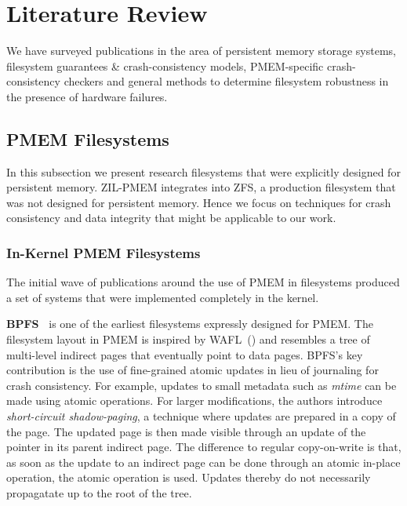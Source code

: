 \documentclass[12pt,a4paper,twoside]{book}
\begin{document}
\section{Literature Review}
We have surveyed publications in the area of persistent memory storage systems, filesystem guarantees \& crash-consistency models, PMEM-specific crash-consistency checkers and general methods to determine filesystem robustness in the presence of hardware failures.

\subsection{PMEM Filesystems}
In this subsection we present research filesystems that were explicitly designed for persistent memory.
ZIL-PMEM integrates into ZFS, a production filesystem that was not designed for persistent memory.
Hence we focus on techniques for crash consistency and data integrity that might be applicable to our work.

\subsubsection{In-Kernel PMEM Filesystems}\label{sec:in_kernel_pmem_filesystems}
The initial wave of publications around the use of PMEM in filesystems produced a set of systems that were implemented completely in the kernel.

\newcommand{\citerelwork}[2]{\textbf{#1~\cite{#2}}}

\citerelwork{BPFS}{conditBetterByteaddressablePersistent2009} is one of the earliest filesystems expressly designed for PMEM.
The filesystem layout in PMEM is inspired by WAFL~(\cite{hitzFileSystemDesign1994}) and resembles a tree of multi-level indirect pages that eventually point to data pages.
BPFS’s key contribution is the use of fine-grained atomic updates in lieu of journaling for crash consistency.
For example, updates to small metadata such as \textit{mtime} can be made using atomic operations.
For larger modifications, the authors introduce \textit{short-circuit shadow-paging}, a technique where updates are prepared in a copy of the page.
The updated page is then made visible through an update of the pointer in its parent indirect page.
The difference to regular copy-on-write is that, as soon as the update to an indirect page can be done through an atomic in-place operation, the atomic operation is used.
Updates thereby do not necessarily propagatate up to the root of the tree.
\end{document}
